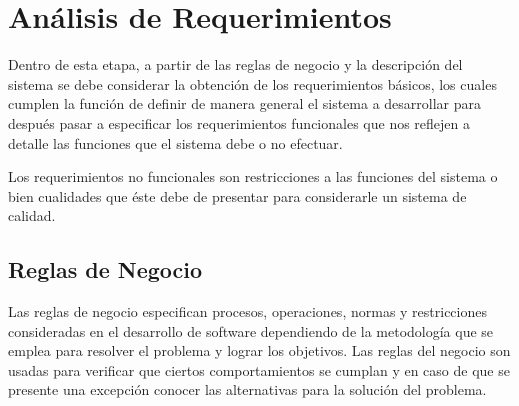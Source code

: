 \newpage
\section{Análisis de Requerimientos}

Dentro de esta etapa, a partir de las reglas de negocio y la descripción del sistema se debe considerar la obtención de los requerimientos básicos, los cuales cumplen la función de definir de manera general el sistema a desarrollar para después pasar a especificar los requerimientos funcionales que nos reflejen a detalle las funciones que el sistema debe o no efectuar.

Los requerimientos no funcionales son restricciones a las funciones del sistema o bien cualidades que éste debe de presentar para considerarle un sistema de calidad.

\subsection{Reglas de Negocio}

Las reglas de negocio especifican procesos, operaciones, normas y restricciones consideradas en el desarrollo de software dependiendo de la metodología que se emplea para resolver el problema y lograr los objetivos. Las reglas del negocio son usadas para verificar que ciertos comportamientos se cumplan y en caso de que se presente una excepción conocer las alternativas para la solución del problema.

